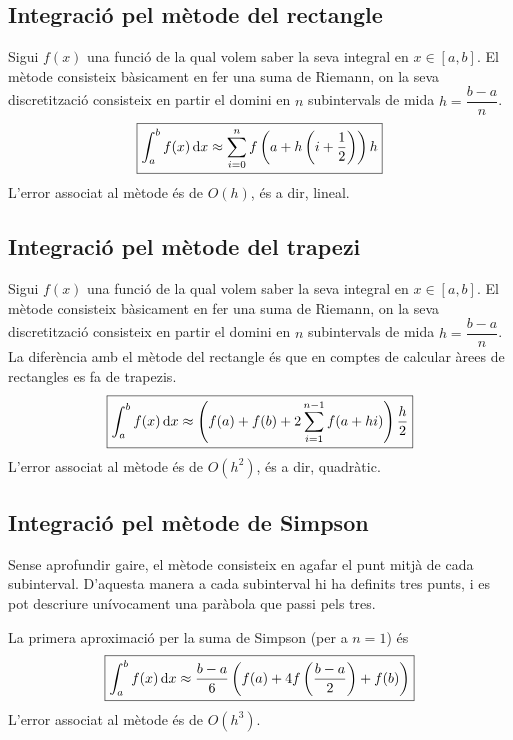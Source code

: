\subsection{Integració pel mètode del rectangle}
Sigui $f(x)$ una funció de la qual volem saber la seva integral en $x \in [a,b]$. El mètode consisteix bàsicament en fer una suma de Riemann, on la seva discretització consisteix en partir el domini en $n$ subintervals de mida $h = \dfrac{b-a}{n}$.
\begin{align}
    \boxed{\int_{a}^{b} f(x) \mathop{}\!\mathrm{d} x \approx \sum_{i=0}^{n} f\left( a + h \left( i + \frac{1}{2} \right) \right) h}
\end{align}
L'error associat al mètode és de $O(h)$, és a dir, lineal.

\subsection{Integració pel mètode del trapezi}
Sigui $f(x)$ una funció de la qual volem saber la seva integral en $x \in [a,b]$. El mètode consisteix bàsicament en fer una suma de Riemann, on la seva discretització consisteix en partir el domini en $n$ subintervals de mida $h = \dfrac{b-a}{n}$. La diferència amb el mètode del rectangle és que en comptes de calcular àrees de rectangles es fa de trapezis.
\begin{align}
    \boxed{\int_{a}^{b} f(x) \mathop{}\!\mathrm{d} x \approx \left( f(a) + f(b) + 2 \sum_{i=1}^{n-1} f(a + hi) \right) \frac{h}{2}}
\end{align}
L'error associat al mètode és de $O(h^{2})$, és a dir, quadràtic.

\subsection{Integració pel mètode de Simpson}
Sense aprofundir gaire, el mètode consisteix en agafar el punt mitjà de cada subinterval. D'aquesta manera a cada subinterval hi ha definits tres punts, i es pot descriure unívocament una paràbola que passi pels tres.

La primera aproximació per la suma de Simpson (per a $n = 1$) és
\begin{align}
    \boxed{\int_{a}^{b} f(x) \mathop{}\!\mathrm{d} x \approx \frac{b-a}{6} \left( f(a) + 4 f\left( \frac{b-a}{2} \right) +f(b) \right)}
\end{align}
L'error associat al mètode és de $O(h^{3})$.

